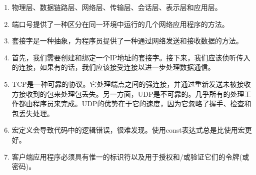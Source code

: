 \begin{enumerate}
	\item 物理层、数据链路层、网络层、传输层、会话层、表示层和应用层。
	\item 端口号提供了一种区分在同一环境中运行的几个网络应用程序的方法。
	\item 套接字是一种抽象，为程序员提供了一种通过网络发送和接收数据的方法。
	\item 首先，我们需要创建和绑定一个IP地址的套接字。接下来，我们应该侦听传入的连接，如果有的话，我们应该接受连接以进一步处理数据通信。
	\item TCP是一种可靠的协议。它处理端点之间的强连接，并通过重新发送未被接收方接收到的包来处理包丢失。另一方面，UDP是不可靠的。几乎所有的处理工作都由程序员来完成。UDP的优势在于它的速度，因为它忽略了握手、检查和包丢失处理。
	\item 宏定义会导致代码中的逻辑错误，很难发现。使用const表达式总是比使用宏更好。
	\item 客户端应用程序必须具有惟一的标识符以及用于授权和/或验证它们的令牌(或密码)。
\end{enumerate}













